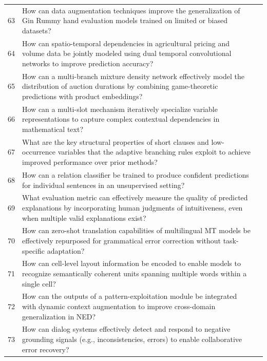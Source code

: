 \begin{longtable}{p{0.8cm}p{9cm}p{2.5cm}}
63 & How can data augmentation techniques improve the generalization of Gin Rummy hand evaluation models trained on limited or biased datasets? & \cite{10.1609/aaai.v35i17.17843} \\
64 & How can spatio-temporal dependencies in agricultural pricing and volume data be jointly modeled using dual temporal convolutional networks to improve prediction accuracy? & \cite{10.1609/aaai.v34i08.7039} \\
65 & How can a multi-branch mixture density network effectively model the distribution of auction durations by combining game-theoretic predictions with product embeddings? & \cite{10.1609/aaai.v38i9.28854} \\
66 & How can a multi-slot mechanism iteratively specialize variable representations to capture complex contextual dependencies in mathematical text? & \cite{10.18653/v1/2022.findings-acl.76} \\
67 & What are the key structural properties of short clauses and low-occurrence variables that the adaptive branching rules exploit to achieve improved performance over prior methods? & \cite{10.1609/aaai.v35i5.16479} \\
68 & How can a relation classifier be trained to produce confident predictions for individual sentences in an unsupervised setting? & \cite{10.18653/v1/p19-1133} \\
69 & What evaluation metric can effectively measure the quality of predicted explanations by incorporating human judgments of intuitiveness, even when multiple valid explanations exist? & \cite{10.1609/aaai.v36i11.21577} \\
70 & How can zero-shot translation capabilities of multilingual MT models be effectively repurposed for grammatical error correction without task-specific adaptation? & \cite{10.18653/v1/2024.eacl-long.73} \\
71 & How can cell-level layout information be encoded to enable models to recognize semantically coherent units spanning multiple words within a single cell? & \cite{10.18653/v1/2021.acl-long.493} \\
72 & How can the outputs of a pattern-exploitation module be integrated with dynamic context augmentation to improve cross-domain generalization in NED? & \cite{10.18653/v1/2022.findings-emnlp.506} \\
73 & How can dialog systems effectively detect and respond to negative grounding signals (e.g., inconsistencies, errors) to enable collaborative error recovery? & \cite{10.18653/v1/2021.eacl-main.41} \\

\end{longtable}
